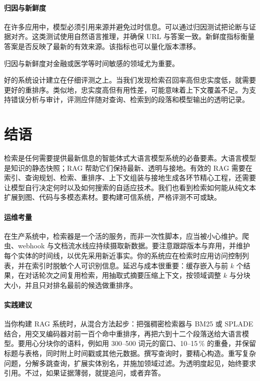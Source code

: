 \paragraph{归因与新鲜度}  在许多应用中，模型必须引用来源并避免过时信息。可以通过归因测试把论断与证据对齐。这类测试使用自然语言推理，并确保 URL 与答案一致。新鲜度指标衡量答案是否反映了最新的有效来源。该指标也可以量化版本漂移。

归因与新鲜度对金融或医学等时间敏感的领域尤为重要。

好的系统设计建立在仔细评测之上。当我们发现检索召回率高但忠实度低，就需要更好的重排序。类似地，忠实度高但有用性差，可能意味着上下文覆盖不足。为支持错误分析与审计，评测应伴随对查询、检索到的段落和模型输出的透明记录。






\section{结语}

检索是任何需要提供最新信息的智能体式大语言模型系统的必备要素。大语言模型是知识的静态快照；RAG 帮助它们保持最新、透明与接地。有效的 RAG 需要在索引、查询规划、检索、重排序、上下文组装与接地生成各环节精心工程，还需要让模型自行决定何时以及如何搜索的自适应技术。我们也看到检索如何能从纯文本扩展到图、代码与多模态素材。要构建可信系统，严格评测不可或缺。

\paragraph{运维考量}  在生产系统中，检索器是一个活的服务，而非一次性脚本，应当被小心维护。爬虫、webhook 与文档流水线应持续摄取新数据。要注意跟踪版本与弃用，并维护每个实体的时间线，以优先采用新近事实。你的系统应在检索时应用访问控制列表，并在索引时脱敏个人可识别信息。延迟与成本很重要：缓存嵌入与前 $k$ 个结果，在对话轮次之间复用检索，用抽取式摘要压缩上下文，按领域调整 $k$ 与分块大小，并且只对排名最前的候选做重排序。

\paragraph{实践建议}  %
当你构建 RAG 系统时，从混合方法起步：把强稠密检索器与 BM25 或 SPLADE 结合，用交叉编码器对前一百个命中重排序，再把六到十二个段落送给大语言模型。要用心分块你的语料，例如用 300–500 词元的窗口、10–15\,\% 的重叠，并保留标题与表格，同时附上时间戳或其他元数据。撰写查询时，要精心构造。重写复杂问题，分解多跳查询，扩展实体别名，并施加领域过滤。为透明度起见，始终要求引用。不过，如果证据薄弱，就提追问，或者弃答。  

